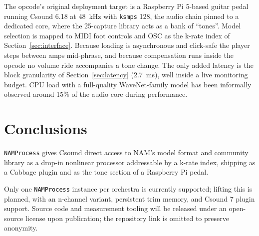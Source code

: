\documentclass[runningheads,a4paper]{llncs}
\begin{document}
The opcode's original deployment target is a Raspberry Pi 5-based
guitar pedal running Csound 6.18 at 48~kHz with \texttt{ksmps} 128, the
audio chain pinned to a dedicated core, where the 25-capture library
acts as a bank of ``tones''. Model selection is mapped to MIDI foot
controls and OSC as the k-rate index of Section~\ref{sec:interface}. Because loading is asynchronous and
click-safe the player steps between amps mid-phrase, and because
compensation runs inside the opcode no volume ride accompanies a tone
change. The only added latency is the block granularity
of Section~\ref{sec:latency} (2.7~ms), well inside a live monitoring
budget.
CPU load with a full-quality WaveNet-family model has been informally
observed around 15\% of the audio core during performance.

\section{Conclusions}
\label{sec:conclusions}

\texttt{NAMProcess} gives Csound direct access to NAM's model format
and community library as a drop-in nonlinear processor addressable by a
k-rate index, shipping as a Cabbage plugin and as the tone section of a
Raspberry Pi pedal.

Only one \texttt{NAMProcess} instance per orchestra is currently
supported; lifting this is planned, with an n-channel variant,
persistent trim memory, and Csound 7 plugin support. Source code and measurement tooling
will be released under an open-source license upon publication; the
repository link is omitted to preserve anonymity.
\end{document}
